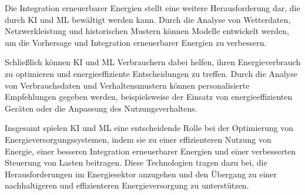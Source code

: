 Die Integration erneuerbarer Energien stellt eine weitere Herausforderung dar,
die durch KI und ML bewältigt werden kann. Durch die Analyse von Wetterdaten,
Netzwerkleistung und historischen Mustern können Modelle entwickelt werden, um
die Vorhersage und Integration erneuerbarer Energien zu verbessern.

Schließlich können KI und ML Verbrauchern dabei helfen, ihren Energieverbrauch
zu optimieren und energieeffiziente Entscheidungen zu treffen. Durch die
Analyse von Verbrauchsdaten und Verhaltensmustern können personalisierte
Empfehlungen gegeben werden, beispielsweise der Einsatz von energieeffizienten
Geräten oder die Anpassung des Nutzungsverhaltens.

Insgesamt spielen KI und ML eine entscheidende Rolle bei der Optimierung von
Energieversorgungssystemen, indem sie zu einer effizienteren Nutzung von
Energie, einer besseren Integration erneuerbarer Energien und einer
verbesserten Steuerung von Lasten beitragen. Diese Technologien tragen dazu
bei, die Herausforderungen im Energiesektor anzugehen und den Übergang zu einer
nachhaltigeren und effizienteren Energieversorgung zu unterstützen.